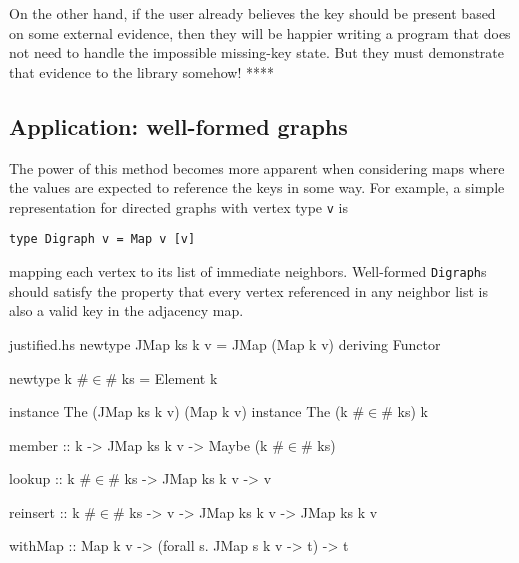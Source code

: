 \documentclass[format=sigplan, review=false, screen=true]{acmart}
\begin{document}
On the other hand, if the user already believes the key should be present based on some
external evidence, then they will be happier writing a program that does not need to handle
the impossible missing-key state. But they must demonstrate that evidence to the library
somehow!  ****

\subsection{Application: well-formed graphs}

The power of this method becomes more apparent when considering maps where
the values are expected to reference the keys in some way. For example, a
simple representation for directed graphs with vertex type \texttt{v} is
\begin{verbatim}
type Digraph v = Map v [v]
\end{verbatim}
mapping each vertex to its list of immediate neighbors. Well-formed \texttt{Digraph}s
should satisfy the property that every vertex referenced in any neighbor list is also
a valid key in the adjacency map.

\begin{filecontents*}{justified.hs}
newtype JMap ks k v = JMap (Map k v)
    deriving Functor

newtype k #$\in$# ks = Element k

instance The (JMap ks k v) (Map k v)
instance The (k #$\in$# ks)  k

member ::  k -> JMap ks k v -> Maybe (k #$\in$# ks)

lookup   :: k #$\in$# ks -> JMap ks k v -> v

reinsert
  :: k #$\in$# ks -> v -> JMap ks k v -> JMap ks k v

withMap
:: Map k v  -> (forall s. JMap s k v -> t) -> t
\end{filecontents*}

\end{document}
